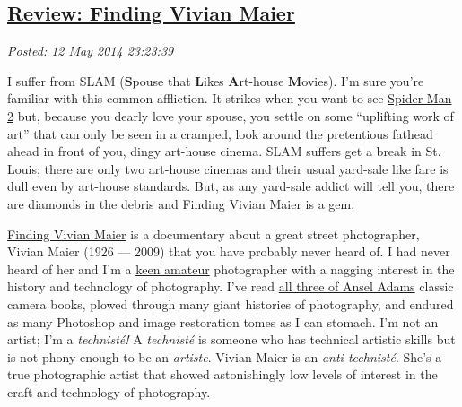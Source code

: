 %

\subsection*{\href{https://bakerjd99.wordpress.com/2014/05/12/review-finding-vivian-maier/}{Review: Finding Vivian Maier}}


\noindent\emph{Posted: 12 May 2014 23:23:39}
\vspace{6pt}

I suffer from SLAM (\textbf{S}pouse that \textbf{L}ikes
\textbf{A}rt-house \textbf{M}ovies). I'm sure you're familiar with this
common affliction. It strikes when you want to see
\href{http://www.rottentomatoes.com/m/spiderman\_2/}{Spider-Man 2} but,
because you dearly love your spouse, you settle on some ``uplifting work
of art'' that can only be seen in a cramped, look around the pretentious
fathead ahead in front of you, dingy art-house cinema. SLAM suffers get
a break in St. Louis; there are only two art-house cinemas and their
usual yard-sale like fare is dull even by art-house standards. But, as
any yard-sale addict will tell you, there are diamonds in the debris and
Finding Vivian Maier is a gem.


\href{http://www.findingvivianmaier.com/}{Finding Vivian Maier} is a
documentary about a great street photographer, Vivian Maier (1926
--- 2009) that you have probably never heard of. I had never heard of her
and I'm a \href{http://conceptcontrol.smugmug.com/}{keen amateur}
photographer with a nagging interest in the history and technology of
photography. I've read
\href{http://www.amazon.com/s/?ie=UTF8\&keywords=ansel+adams+the+camera\&tag=googhydr-20\&index=aps\&hvadid=28302426801\&hvpos=1t1\&hvexid=\&hvnetw=g\&hvrand=1899326277021743497\&hvpone=\&hvptwo=\&hvqmt=b\&hvdev=c\&ref=pd\_sl\_1mhliw1po6\_b}{all
three of Ansel Adams} classic camera books, plowed through many giant
histories of photography, and endured as many Photoshop and image
restoration tomes as I can stomach. I'm not an artist; I'm a
\emph{technisté!} A \emph{technisté} is someone who has technical
artistic skills but is not phony enough to be an \emph{artiste}. Vivian
Maier is an \emph{anti-technisté}. She's a true photographic artist that
showed astonishingly low levels of interest in the craft and technology
of photography.

